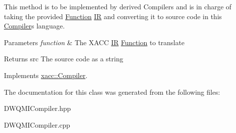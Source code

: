 This method is to be implemented by derived Compilers and is in charge of taking the provided \hyperlink{a01151}{Function} \hyperlink{a01175}{IR} and converting it to source code in this \hyperlink{a01127}{Compiler}\textquotesingle{}s language.


\begin{DoxyParams}{Parameters}
{\em function} & The X\+A\+CC \hyperlink{a01175}{IR} \hyperlink{a01151}{Function} to translate \\
\hline
\end{DoxyParams}
\begin{DoxyReturn}{Returns}
src The source code as a string 
\end{DoxyReturn}


Implements \hyperlink{a01127_aeedbe58a33fed29e4d7694ae743e25e7}{xacc\+::\+Compiler}.



The documentation for this class was generated from the following files\+:\begin{DoxyCompactItemize}
\item 
D\+W\+Q\+M\+I\+Compiler.\+hpp\item 
D\+W\+Q\+M\+I\+Compiler.\+cpp\end{DoxyCompactItemize}
